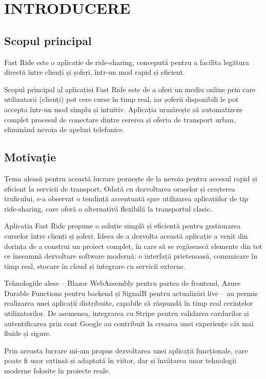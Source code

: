 \chapter{INTRODUCERE}
\section{Scopul principal}
Fast Ride este o aplicație de ride-sharing, concepută pentru a facilita legătura directă între clienți și șoferi, într-un mod rapid și eficient.

Scopul principal al aplicației Fast Ride este de a oferi un mediu online prin care utilizatorii (clienți) pot cere curse în timp real, iar șoferii disponibili le pot accepta într-un mod simplu și intuitiv. Aplicația urmărește să automatizeze complet procesul de conectare dintre cererea și oferta de transport urban, eliminând nevoia de apeluri telefonice.

\section{Motivație}
Tema aleasă pentru această lucrare pornește de la nevoia pentru accesul rapid și eficient la servicii de transport. Odată cu dezvoltarea orașelor și creșterea traficului, s-a observat o tendință accentuată spre utilizarea aplicațiilor de tip ride-sharing, care oferă o alternativă flexibilă la transportul clasic.

Aplicația Fast Ride propune o soluție simplă și eficientă pentru gestionarea curselor între clienți și șoferi. Ideea de a dezvolta această aplicație a venit din dorința de a construi un proiect complet, în care să se regăsească elemente din tot ce înseamnă dezvoltare software modernă: o interfață prietenoasă, comunicare în timp real, stocare în cloud și integrare cu servicii externe.

Tehnologiile alese – Blazor WebAssembly pentru partea de frontend, Azure Durable Functions pentru backend și SignalR pentru actualizări live – au permis realizarea unei aplicații distribuite, capabile să răspundă în timp real cerințelor utilizatorilor. De asemenea, integrarea cu Stripe pentru validarea cardurilor și autentificarea prin cont Google au contribuit la crearea unei experiențe cât mai fluide și sigure.

Prin aceasta lucrare mi-am propus dezvoltarea unei aplicații funcționale, care poate fi ușor extinsă și adaptată în viitor, dar și învățarea unor tehnologii moderne folosite în proiecte reale.
